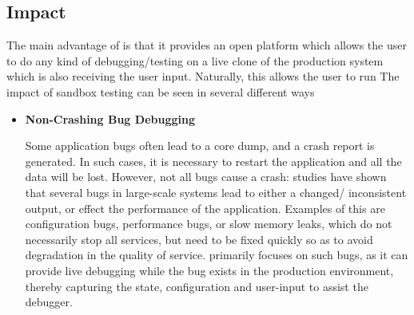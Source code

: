 \subsection{Impact}
\label{sec:impact}

The main advantage of \parikshan is that it provides an open platform which allows the user to do any kind of debugging/testing on a live clone of the production system which is also receiving the user input.
Naturally, this allows the user to run 
The impact of sandbox testing can be seen in several different ways

\begin{itemize}

 \item \textbf{Non-Crashing Bug Debugging}
 
 Some application bugs often lead to a core dump, and a crash report is generated. 
 In such cases, it is necessary to restart the application and all the data will be lost.
 However,  not all bugs cause a crash: studies have shown \cite{Zhang:2013:ADS:2486788.2486830, liu2005mining, kremenek2007factor} that several bugs in large-scale systems lead to either a changed/ inconsistent output, or effect the performance of the application.
 Examples of this are configuration bugs, performance bugs, or slow memory leaks, which do not necessarily stop all services, but need to be fixed quickly so as to avoid degradation in the quality of service.
 \parikshan primarily focuses on such bugs, as it can provide live debugging while the bug exists in the production environment, thereby capturing the state, configuration and user-input to assist the debugger.


\end{itemize}
